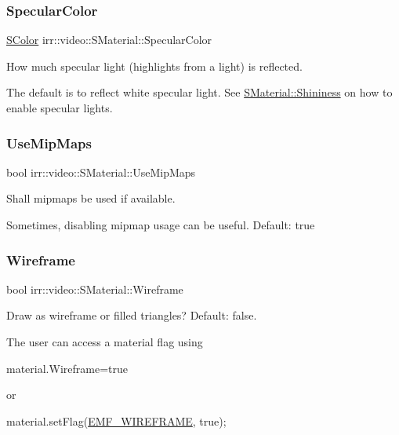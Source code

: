 \subsubsection{\texorpdfstring{Specular\+Color}{SpecularColor}}
{\footnotesize\ttfamily \hyperlink{classirr_1_1video_1_1SColor}{S\+Color} irr\+::video\+::\+S\+Material\+::\+Specular\+Color}



How much specular light (highlights from a light) is reflected. 

The default is to reflect white specular light. See \hyperlink{classirr_1_1video_1_1SMaterial_a877106a83108db6d1f30a38379d28494}{S\+Material\+::\+Shininess} on how to enable specular lights. \mbox{\label{classirr_1_1video_1_1SMaterial_a98aab3128696d9ad3f0f516153f7bae0}} 
\subsubsection{\texorpdfstring{Use\+Mip\+Maps}{UseMipMaps}}
{\footnotesize\ttfamily bool irr\+::video\+::\+S\+Material\+::\+Use\+Mip\+Maps}



Shall mipmaps be used if available. 

Sometimes, disabling mipmap usage can be useful. Default\+: true \mbox{\label{classirr_1_1video_1_1SMaterial_a6fb428e6e27d0e143cc7da5ea19f8dcc}} 
\subsubsection{\texorpdfstring{Wireframe}{Wireframe}}
{\footnotesize\ttfamily bool irr\+::video\+::\+S\+Material\+::\+Wireframe}



Draw as wireframe or filled triangles? Default\+: false. 

The user can access a material flag using 
\begin{DoxyCode}
material.Wireframe=\textcolor{keyword}{true} 
\end{DoxyCode}
 or
\begin{DoxyCode}
material.setFlag(\hyperlink{namespaceirr_1_1video_a8a3bc00ae8137535b9fbc5f40add70d3acf89a74faf666bad4b8ce8d12750e158}{EMF\_WIREFRAME}, \textcolor{keyword}{true}); 
\end{DoxyCode}
 \mbox{\label{classirr_1_1video_1_1SMaterial_a7e604773b2ac61ab7a15ec9afef0dabf}} 
